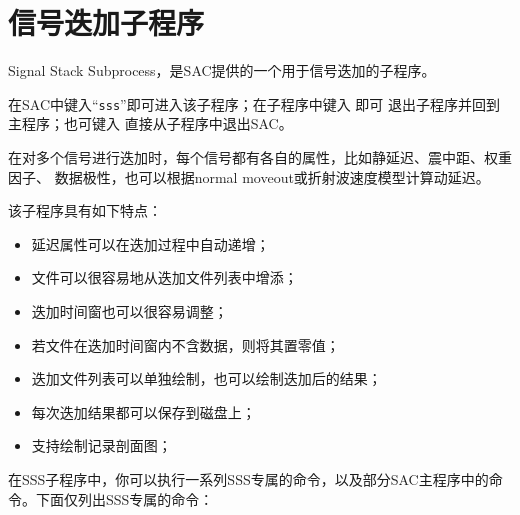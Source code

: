 \section{信号迭加子程序}
Signal Stack Subprocess，是SAC提供的一个用于信号迭加的子程序。

在SAC中键入``\texttt{sss}''即可进入该子程序；在子程序中键入  即可
退出子程序并回到主程序；也可键入  直接从子程序中退出SAC。

在对多个信号进行迭加时，每个信号都有各自的属性，比如静延迟、震中距、权重因子、
数据极性，也可以根据normal moveout或折射波速度模型计算动延迟。

该子程序具有如下特点：
\begin{itemize}
\item 延迟属性可以在迭加过程中自动递增；
\item 文件可以很容易地从迭加文件列表中增添；
\item 迭加时间窗也可以很容易调整；
\item 若文件在迭加时间窗内不含数据，则将其置零值；
\item 迭加文件列表可以单独绘制，也可以绘制迭加后的结果；
\item 每次迭加结果都可以保存到磁盘上；
\item 支持绘制记录剖面图；
\end{itemize}

在SSS子程序中，你可以执行一系列SSS专属的命令，以及部分SAC主程序中的命令。下面仅列出SSS专属的命令：

